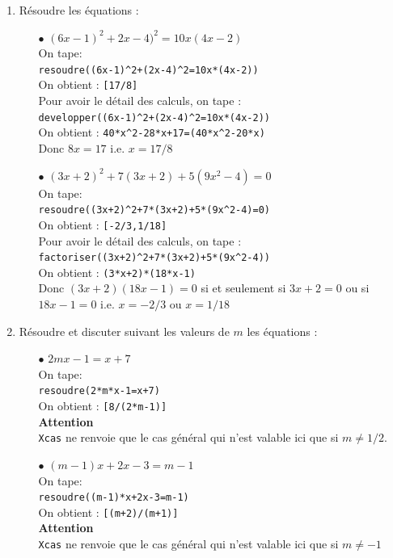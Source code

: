 \documentclass[a4paper,11pt]{book}
\begin{document}
\begin{enumerate}
\item R\'esoudre les \'equations :
\begin{itemize}
\item[$\bullet$] $(6x-1)^2+2x-4)^2=10x(4x-2)$\\
On tape:\\
{\tt resoudre((6x-1)\verb|^|2+(2x-4)\verb|^|2=10x*(4x-2))}\\
On obtient : {\tt [17/8]}\\
Pour avoir le d\'etail des calculs, on tape :\\
{\tt developper((6x-1)\verb|^|2+(2x-4)\verb|^|2=10x*(4x-2))}\\
On obtient : {\tt 40*x\verb|^|2-28*x+17=(40*x\verb|^|2-20*x)}\\
Donc $8x=17$ i.e. $x=17/8$
\item[$\bullet$] $(3x+2)^2+7(3x+2)+5(9x^2-4)=0$\\
On tape:\\
{\tt resoudre((3x+2)\verb|^|2+7*(3x+2)+5*(9x\verb|^|2-4)=0)}\\
On obtient : {\tt [-2/3,1/18]}\\
Pour avoir le d\'etail des calculs, on tape :\\
{\tt factoriser((3x+2)\verb|^|2+7*(3x+2)+5*(9x\verb|^|2-4))}\\
On obtient : {\tt (3*x+2)*(18*x-1)}\\
Donc $(3x+2)(18x-1)=0$ si et seulement si $3x+2=0$ ou si $18x-1=0$ i.e.
$x=-2/3$ ou $x=1/18$
\end{itemize}
\item R\'esoudre et discuter suivant les valeurs de $m$ les \'equations :
\begin{itemize}
\item[$\bullet$] $2mx-1=x+7$\\
On tape:\\
{\tt resoudre(2*m*x-1=x+7)}\\
On obtient : {\tt [8/(2*m-1)]}\\
{\bf Attention} \\
{\tt Xcas} ne renvoie que le cas g\'en\'eral qui n'est valable 
ici que si $m\neq 1/2$.
\item[$\bullet$] $(m-1)x+2x-3=m-1$\\
On tape:\\
{\tt resoudre((m-1)*x+2x-3=m-1)}\\
On obtient : {\tt [(m+2)/(m+1)]}\\
{\bf Attention} \\
{\tt Xcas} ne renvoie que le cas g\'en\'eral qui n'est valable ici que si 
$m\neq -1$
\end{itemize}
\end{enumerate}
\end{document}
